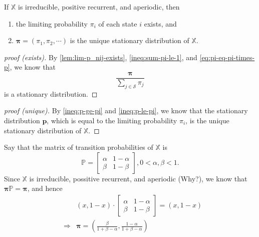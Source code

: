\begin{theorem}
If $ \mathbb{X} $ is irreducible, positive recurrent, and aperiodic, then
\begin{enumerate}
  \item the limiting probability $ \pi_{i} $ of each state $ i $ exists, and
  \item $ \boldsymbol\pi = (\pi_{1}, \pi_{2}, \cdots) $ is the unique stationary distribution of $ \mathbb{X} $.
\end{enumerate}

\begin{proof}[proof (exists)]
By \autoref{lem:lim-p_nij-exists}, \autoref{ineq:sum-pi-le-1}, and \autoref{eq:pi-eq-pi-times-p}, we know that
\[ \frac{\boldsymbol\pi}{\sum_{j \in \mathcal{S}} \pi_{j}} \]
is a stationary distribution.
\end{proof}

\begin{comment}
By \autoref{lem:lim-p_nij-exists}, we know that the limiting probability $ \pi_{i} $ exists for all $ i \in \mathcal{S} $,
\[ \sum_{j \in \mathcal{S}} \pi_{j} \neq \infty, \text{\hspace{1em} \small (by \autoref{ineq:sum-pi-le-1})} \]
and
\[ \frac{\boldsymbol\pi}{\sum_{j \in \mathcal{S}} \pi_{j}} = \frac{\boldsymbol\pi \mathbb{P}}{\sum_{j \in \mathcal{S}} \pi_{j}}. \text{\hspace{1em} \small (by \autoref{eq:pi-eq-pi-times-p})} \]
\end{comment}

\begin{proof}[proof (unique)]
By \autoref{ineq:p-ge-pi} and \autoref{ineq:p-le-pi}, we know that the stationary distribution $ \mathbf{p} $, which is equal to the limiting probability $ \pi_{i} $, is the unique stationary distribution of $ \mathbb{X} $.
\end{proof}
\end{theorem}

\begin{example}
Say that the matrix of transition probabilities of $ \mathbb{X} $ is
\[ \mathbb{P} = \begin{bmatrix}
  \alpha  & 1 - \alpha \\
  \beta   & 1 - \beta
\end{bmatrix}, 0 < \alpha, \beta < 1. \]
Since $ \mathbb{X} $ is irreducible, possitive recurrent, and aperiodic {\color{red} (Why?)}, we know that $ \boldsymbol\pi \mathbb{P} = \boldsymbol\pi $, and hence
\begin{eqnarray*}
& & (x, 1 - x) \cdot \begin{bmatrix}
  \alpha  & 1 - \alpha \\
  \beta   & 1 - \beta
\end{bmatrix} = (x, 1 - x) \\
& \Rightarrow & \boldsymbol\pi = \left( \frac{\beta}{1 + \beta - \alpha}, \frac{1 - \alpha}{1 + \beta - \alpha} \right)
\end{eqnarray*}
\end{example}

